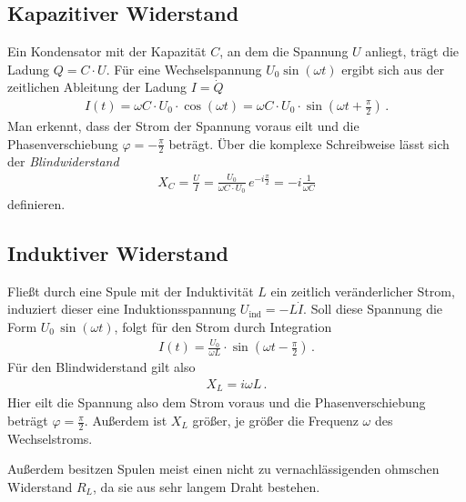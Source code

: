 \documentclass[12pt,a4paper,titlepage,headinclude,bibtotoc]{scrartcl}
\begin{document}
\subsection{Kapazitiver Widerstand}
Ein Kondensator mit der Kapazität $C$, an dem die Spannung $U$ anliegt, trägt die Ladung $Q=C\cdot U$.
Für eine Wechselspannung $U_0\sin(\omega t)$ ergibt sich aus der zeitlichen Ableitung der Ladung $I=\dot{Q}$
\begin{align}
	I(t)=\omega C\cdot U_0\cdot \cos(\omega t)=\omega C\cdot U_0\cdot\sin\left(\omega t+\frac{\pi}{2}\right)\,.
\end{align}
Man erkennt, dass der Strom der Spannung voraus eilt und die Phasenverschiebung $\varphi=-\frac{\pi}{2}$ beträgt.
Über die komplexe Schreibweise lässt sich der \textit{Blindwiderstand}
\begin{align}
	X_C=\frac{U}{I}= \frac{U_0}{\omega C \cdot U_0}\, e^{-i\frac{\pi}{2}}=-i\frac{1}{\omega C}
\end{align}
definieren.

\subsection{Induktiver Widerstand}
Fließt durch eine Spule mit der Induktivität $L$ ein zeitlich veränderlicher Strom, induziert dieser eine Induktionsspannung $U_\text{ind}=-L\dot{I}$.
Soll diese Spannung die Form $U_0\,\sin(\omega t)$, folgt für den Strom durch Integration
\begin{align}
	I(t)=\frac{U_0}{\omega L}\cdot \sin\left(\omega t-\frac{\pi}{2}\right)\,.
\end{align}
Für den Blindwiderstand gilt also
\begin{align}
	X_L=i\omega L \,.
\end{align}
Hier eilt die Spannung also dem Strom voraus und die Phasenverschiebung beträgt $\varphi=\frac{\pi}{2}$.
Außerdem ist $X_L$ größer, je größer die Frequenz $\omega$ des Wechselstroms.

Außerdem besitzen Spulen meist einen nicht zu vernachlässigenden ohmschen Widerstand $R_L$, da sie aus sehr langem Draht bestehen.
\end{document}
